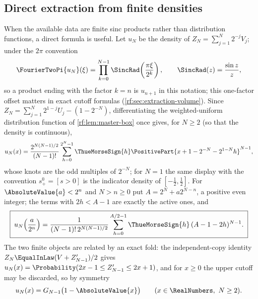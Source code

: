\documentclass[11pt,oneside]{article}
\theoremstyle{plain}
\theoremstyle{definition}
\theoremstyle{remark}
\newcommand{\tm}[1]{\ThueMorseSign{#1}}     %
\newcommand{\Prob}{\Probability}
\begin{document}
\subsection{Direct extraction from finite densities}
\label{rf:sec:rvachev-density}

When the available data are finite sinc products rather than distribution
functions, a direct formula is useful.  Let $u_{N}$ be the density of
$Z_{N}=\sum_{j=1}^{N}2^{-j}V_{j}$; under the $2\pi$ convention
\begin{equation}
 \FourierTwoPi{u_{N}}(\xi)=\prod_{k=0}^{N-1}\SincRad\!\left(\frac{\pi\xi}{2^{k}}\right),
 \qquad\SincRad(z)=\frac{\sin z}{z},
 \label{rf:eq:rvachev-sinc}
\end{equation}
so a product ending with the factor $k=n$ is $u_{n+1}$ in this notation; this
one-factor offset matters in exact cutoff formulas
(\cref{rf:sec:extraction-volume}).  Since
$Z_{N}=\sum_{j=1}^{N}2^{1-j}U_{j}-(1-2^{-N})$, differentiating the
weighted-uniform distribution function of \cref{rf:lem:master-box} once
gives, for $N\ge2$ (so that the density is continuous),
\begin{equation}
 u_{N}(x)=\frac{2^{N(N-1)/2}}{(N-1)!}\sum_{h=0}^{2^{N}-1}\tm{h}
 \PositivePart{x+1-2^{-N}-2^{1-N}h}^{N-1},
 \label{rf:eq:rvachev-density-spline}
\end{equation}
whose knots are the odd multiples of $2^{-N}$; for $N=1$ the same display
with the convention $s_{+}^{0}=[s>0]$ is the indicator density of
$[-\tfrac12,\tfrac12]$.  For $\AbsoluteValue{a}<2^{n}$ and $N>n\ge0$ put
$A=2^{N}+a2^{N-n}$, a positive even integer; the terms with $2h<A-1$ are
exactly the active ones, and
\begin{equation}
 \boxed{\;
 u_{N}\!\left(\frac{a}{2^{n}}\right)
 =\frac{1}{(N-1)!\,2^{N(N-1)/2}}\sum_{h=0}^{A/2-1}\tm{h}\,(A-1-2h)^{N-1}.\;}
 \label{rf:eq:rvachev-density-integer}
\end{equation}
The two finite objects are related by an exact fold: the independent-copy
identity $Z_{N}\EqualInLaw(V+Z'_{N-1})/2$ gives
$u_{N}(x)=\Prob(2x-1\le Z'_{N-1}\le2x+1)$, and for $x\ge0$ the upper cutoff
may be discarded, so by symmetry
\begin{equation}
 u_{N}(x)=G_{N-1}\bigl(1-\AbsoluteValue{x}\bigr)\qquad(x\in\RealNumbers,\ N\ge2).
 \label{rf:eq:rvachev-finite-fold}
\end{equation}
\end{document}
